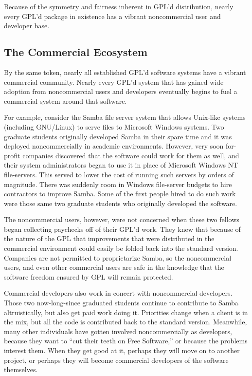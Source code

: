 \documentclass[11pt, letterpaper]{book}
\begin{document}
Because of the symmetry and fairness inherent in GPL'd distribution,
nearly every GPL'd package in existence has a vibrant noncommercial user
and developer base.

\subsection{The Commercial Ecosystem}

By the same token, nearly all established GPL'd software systems have a
vibrant commercial community. Nearly every GPL'd system that has gained
wide adoption from noncommercial users and developers eventually begins
to fuel a commercial system around that software.

For example, consider the Samba file server system that allows Unix-like
systems (including GNU/Linux) to serve files to Microsoft Windows systems.
Two graduate students originally developed Samba in their spare time and
it was deployed noncommercially in academic environments. However, very
soon for-profit companies discovered that the software could work for them
as well, and their system administrators began to use it in place of
Microsoft Windows NT file-servers. This served to lower the cost of
running such servers by orders of magnitude. There was suddenly room in
Windows file-server budgets to hire contractors to improve Samba. Some of
the first people hired to do such work were those same two graduate
students who originally developed the software.

The noncommercial users, however, were not concerned when these two
fellows began collecting paychecks off of their GPL'd work. They knew
that because of the nature of the GPL that improvements that were
distributed in the commercial environment could easily be folded back into
the standard version. Companies are not permitted to proprietarize
Samba, so the noncommercial users, and even other commercial users are
safe in the knowledge that the software freedom ensured by GPL will remain
protected.

Commercial developers also work in concert with noncommercial
developers. Those two now-long-since graduated students continue to
contribute to Samba altruistically, but also get paid work doing it.
Priorities change when a client is in the mix, but all the code is
contributed back to the standard version. Meanwhile, many other
individuals have gotten involved noncommercially as developers,
because they want to ``cut their teeth on Free Software,'' or because
the problems interest them. When they get good at it, perhaps they
will move on to another project, or perhaps they will become
commercial developers of the software themselves.
\end{document}
